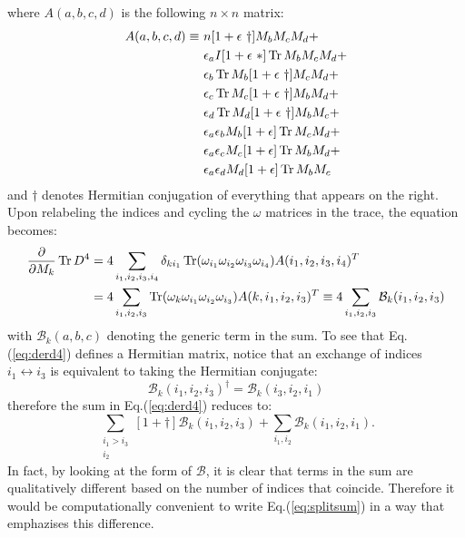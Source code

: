 where $A(a, b, c, d )$ is the following $n \times n$ matrix:
\begin{align}
A(a,b,c,d) \equiv \ &n [1+\epsilon \ \dagger] M_b M_c M_d + \notag \\
&\epsilon_a I [1 + \epsilon \ *] \operatorname{Tr} M_b M_c M_d  + \notag \\
&\epsilon_b \operatorname{Tr} M_b [1 + \epsilon \ \dagger] M_c M_d + \notag \\
&\epsilon_c \operatorname{Tr} M_c [1 + \epsilon \ \dagger] M_b M_d + \notag \\
&\epsilon_d \operatorname{Tr} M_d [1 + \epsilon \ \dagger] M_b M_c + \notag \\
&\epsilon_a \epsilon_b M_b [1 + \epsilon] \operatorname{Tr} M_c M_d + \notag \\
&\epsilon_a \epsilon_c M_c [1 + \epsilon] \operatorname{Tr} M_b M_d + \notag \\
&\epsilon_a \epsilon_d M_d [1 + \epsilon] \operatorname{Tr} M_b M_c
\end{align}
and $\dagger$ denotes Hermitian conjugation of everything that appears on the right. Upon relabeling the indices and cycling the $\omega$ matrices in the trace, the equation becomes:
\begin{align}\label{eq:derd4}
\frac{\partial}{\partial M_k} \operatorname{Tr} D^4 &= 4 \sum_{i_1, i_2, i_3, i_4} \delta_{ki_1} \operatorname{Tr} (\omega_{i_1} \omega_{i_2} \omega_{i_3} \omega_{i_4}) A(i_1, i_2, i_3, i_4)^T \notag \\
&= 4 \sum_{i_1, i_2, i_3} \operatorname{Tr} (\omega_{k} \omega_{i_1} \omega_{i_2} \omega_{i_3}) A(k, i_1, i_2, i_3)^T \equiv 4 \sum_{i_1, i_2, i_3} \mathcal{B}_k(i_1, i_2, i_3)
\end{align}
with $\mathcal{B}_k(a, b, c)$ denoting the generic term in the sum.\newline
To see that Eq.(\ref{eq:derd4}) defines a Hermitian matrix, notice that an exchange of indices $i_1 \leftrightarrow i_3$ is equivalent to taking the Hermitian conjugate:
\begin{equation}\label{eq:BBd}
\mathcal{B}_k(i_1, i_2, i_3)^{\dagger} = \mathcal{B}_k(i_3, i_2, i_1)
\end{equation}
therefore the sum in Eq.(\ref{eq:derd4}) reduces to:
\begin{equation}\label{eq:splitsum}
\sum_{\substack{i_1 > i_3 \\ i_2}} [1+\dagger] \mathcal{B}_k(i_1, i_2, i_3) + \sum_{i_1, i_2} \mathcal{B}_k(i_1, i_2, i_1).
\end{equation}
In fact, by looking at the form of $\mathcal{B}$, it is clear that terms in the sum are qualitatively different based on the number of indices that coincide. Therefore it would be computationally convenient to write Eq.(\ref{eq:splitsum}) in a way that emphazises this difference.\newline
